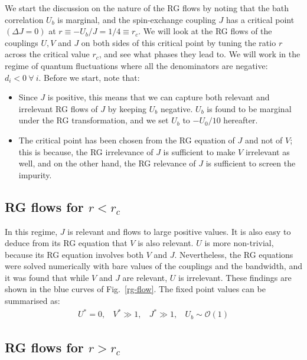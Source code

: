 \documentclass[reprint,superscriptaddress,floatfix]{revtex4-2}
\begin{document}
We start the discussion on the nature of the RG flows by noting that the bath correlation \(U_b\) is marginal, and the spin-exchange coupling \(J\) has a critical point \(\left( \Delta J = 0 \right) \) at \(r \equiv -U_b/J = 1/4 \equiv r_c\). We will look at the RG flows of the couplings \(U,V\) and \(J\) on both sides of this critical point by tuning the ratio \(r\) across the critical value \(r_c\), and see what phases they lead to. We will work in the regime of quantum fluctuations where all the denominators are negative: \(d_i < 0 ~\forall~i\). Before we start, note that:
\begin{itemize}
	\item Since \(J\) is positive, this means that we can capture both relevant and irrelevant RG flows of \(J\) by keeping \(U_b\) negative. \(U_b\) is found to be marginal under the RG transformation, and we set \(U_b\) to \(-U_0/10\) hereafter.
	\item The critical point has been chosen from the RG equation of \(J\) and not of \(V\); this is because, the RG irrelevance of \(J\) is sufficient to make \(V\) irrelevant as well, and on the other hand, the RG relevance of \(J\) is sufficient to screen the impurity.
\end{itemize}
  

\subsection{RG flows for \(r < r_c\)}

In this regime, \(J\) is relevant and flows to large positive values. It is also easy to deduce from its RG equation that \(V\) is also relevant. \(U\) is more non-trivial, because its RG equation involves both \(V\) and \(J\). Nevertheless, the RG equations were solved numerically with bare values of the couplings and the bandwidth, and it was found that while \(V\) and \(J\) are relevant, \(U\) is irrelevant. These findings are shown in the blue curves of Fig.~\ref{rg-flow}. The fixed point values can be summarised as:
\begin{equation}\begin{aligned}
	U^* = 0, ~ ~ ~ ~ V^* \gg 1, ~ ~ ~ ~ J^* \gg 1, ~ ~ ~ ~ U_b \sim \mathcal{O}(1)
\end{aligned}\end{equation}


\subsection{RG flows for \(r > r_c\)}
\end{document}
